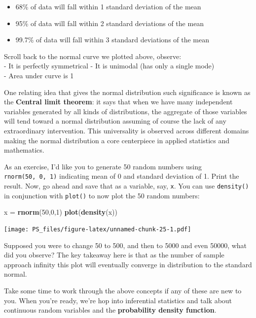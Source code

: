 \documentclass[]{article}
\newenvironment{Shaded}{\begin{snugshade}}{\end{snugshade}}
\newcommand{\DecValTok}[1]{\textcolor[rgb]{0.00,0.00,0.81}{#1}}
\newcommand{\KeywordTok}[1]{\textcolor[rgb]{0.13,0.29,0.53}{\textbf{#1}}}
\newcommand{\NormalTok}[1]{#1}
\newcommand{\StringTok}[1]{\textcolor[rgb]{0.31,0.60,0.02}{#1}}
\providecommand{\tightlist}{%
  \setlength{\itemsep}{0pt}\setlength{\parskip}{0pt}}
\begin{document}
\begin{itemize}
\tightlist
\item
  68\% of data will fall within 1 standard deviation of the mean\\
\item
  95\% of data will fall within 2 standard deviations of the mean
\item
  99.7\% of data will fall within 3 standard deviations of the mean
\end{itemize}

Scroll back to the normal curve we plotted above, observe:\\
- It is perfectly symmetrical - It is unimodal (has only a single
mode)\\
- Area under curve is 1

One relating idea that gives the normal distribution such significance
is known as the \textbf{Central limit theorem}: it says that when we
have many independent variables generated by all kinds of distributions,
the aggregate of those variables will tend toward a normal distribution
assuming of course the lack of any extraordinary intervention. This
universality is observed across different domains making the normal
distribution a core centerpiece in applied statistics and mathematics.

As an exercise, I'd like you to generate 50 random numbers using
\texttt{rnorm(50,\ 0,\ 1)} indicating mean of 0 and standard deviation
of 1. Print the result. Now, go ahead and save that as a variable, say,
\texttt{x}. You can use \texttt{density()} in conjunction with
\texttt{plot()} to now plot the 50 random numbers:

\begin{Shaded}
\begin{Highlighting}[]
\NormalTok{x =}\StringTok{ }\KeywordTok{rnorm}\NormalTok{(}\DecValTok{50}\NormalTok{,}\DecValTok{0}\NormalTok{,}\DecValTok{1}\NormalTok{)}
\KeywordTok{plot}\NormalTok{(}\KeywordTok{density}\NormalTok{(x))}
\end{Highlighting}
\end{Shaded}

\texttt{[image: PS\_files/figure-latex/unnamed-chunk-25-1.pdf]}

Supposed you were to change 50 to 500, and then to 5000 and even 50000,
what did you observe? The key takeaway here is that as the number of
sample approach infinity this plot will eventually converge in
distribution to the standard normal.

Take some time to work through the above concepts if any of these are
new to you. When you're ready, we're hop into inferential statistics and
talk about continuous random variables and the \textbf{probability
density function}.
\end{document}
